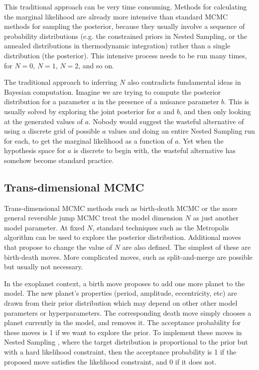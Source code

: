 \documentclass[useAMS,usenatbib]{mn2e}
\begin{document}
This traditional approach can be very time consuming.
Methods for calculating the marginal likelihood are
already more intensive than standard MCMC methods for sampling the posterior,
because they usually involve a sequence of probability distributions
(e.g. the constrained priors in Nested Sampling, or the annealed distributions
in thermodynamic integration) rather than a single distribution (the posterior).
This intensive process needs to be run many times, for $N=0$, $N=1$, $N=2$, and
so on.

The traditional approach to inferring $N$ also contradicts
fundamental ideas in Bayesian
computation. Imagine we are trying to compute the posterior distribution for
a parameter $a$ in the presence of a nuisance parameter $b$. This is usually solved
by exploring the joint posterior for $a$ and $b$, and then only looking at the
generated values of $a$. Nobody would suggest the wasteful alternative
of using a discrete grid of possible $a$ values and doing an entire Nested
Sampling run for each, to get the marginal likelihood as a function of $a$.
Yet when the hypothesis space for $a$ is discrete to begin with, the wasteful
alternative has somehow become standard practice.



\subsection{Trans-dimensional MCMC}
Trans-dimensional MCMC methods such as birth-death MCMC \citep{birthdeath} or the
more general reversible jump MCMC \citep{green} treat the model dimension
$N$ as just another model parameter. At fixed $N$, standard techniques such
as the Metropolis algorithm can be used to explore the posterior distribution.
Additional moves that propose to change the value of $N$ are also defined. The
simplest of these are birth-death moves. More complicated moves, such as
split-and-merge \citep[e.g.][]{umstatter} are possible but usually not necessary.

In the exoplanet context, a birth move
proposes to add one more planet to the model. The new planet's properties
(period, amplitude, eccentricity, etc) are drawn from their prior distribution
which may depend on other other model parameters or hyperparameters.
The corresponding death move simply chooses a planet currently in the model,
and removes it. The acceptance probability for these moves is 1 if we want
to explore the prior. To implement these moves in Nested Sampling
\citep{skilling}, where the target distribution is proportional to the prior but with a hard likelihood
constraint, then the acceptance probability is 1 if the proposed move
satisfies the likelihood constraint, and 0 if it does not.
\end{document}

